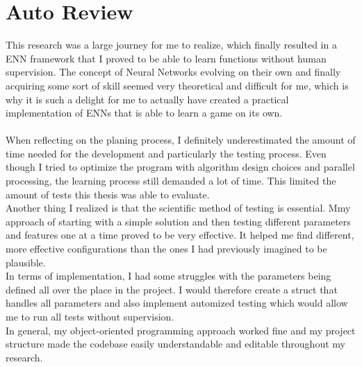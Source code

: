 \section{Auto Review}\label{sec:auto-review}
This research was a large journey for me to realize, which finally resulted in a ENN framework that I proved to be able to learn functions without human supervision.
The concept of Neural Networks evolving on their own and finally acquiring some sort of skill seemed very theoretical and difficult for me, which is why it is such a delight for me to actually have created a practical implementation of ENNs that is able to learn a game on its own.
\\ \\
When reflecting on the planing process, I definitely underestimated the amount of time needed for the development and particularly the testing process.
Even though I tried to optimize the program with algorithm design choices and parallel processing, the learning process still demanded a lot of time.
This limited the amount of tests this thesis was able to evaluate.
\\
Another thing I realized is that the scientific method of testing is essential.
Mmy approach of starting with a simple solution and then testing different parameters and features one at a time proved to be very effective.
It helped me find different, more effective configurations than the ones I had previously imagined to be plausible.
\\
In terms of implementation, I had some struggles with the parameters being defined all over the place in the project.
I would therefore create a struct that handles all parameters and also implement automized testing which would allow me to run all tests without supervision.
\\
In general, my object-oriented programming approach worked fine and my project structure made the codebase easily understandable and editable throughout my research.


